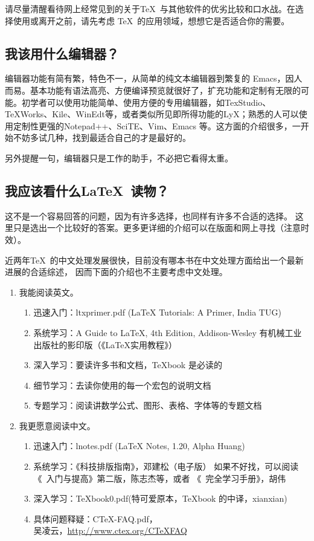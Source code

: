 请尽量清醒看待网上经常见到的关于\TeX~与其他软件的优劣比较和口水战。在选择使用或离开之前，请先考虑
\TeX~的应用领域，想想它是否适合你的需要。
\subsection{我该用什么编辑器？}
编辑器功能有简有繁，特色不一，从简单的纯文本编辑器到繁复的 Emacs，因人而易。基本功能有语法高亮、方便编译预览就很好了，扩充功能和定制有无限的可能。初学者可以使用功能简单、使用方便的专用编辑器，如TexStudio、TeXWorks、Kile、WinEdt等，或者类似所见即所得功能的LyX；熟悉的人可以使用定制性更强的Notepad++、SciTE、Vim、Emacs 等。这方面的介绍很多，一开始不妨多试几种，找到最适合自己的才是最好的。

另外提醒一句，编辑器只是工作的助手，不必把它看得太重。
\subsection{我应该看什么\LaTeX~读物？}
这不是一个容易回答的问题，因为有许多选择，也同样有许多不合适的选择。
这里只是选出一个比较好的答案。更多更详细的介绍可以在版面和网上寻找（注意时效）。

近两年\TeX~的中文处理发展很快，目前没有哪本书在中文处理方面给出一个最新进展的合适综述，
因而下面的介绍也不主要考虑中文处理。

\begin{enumerate}
	\item 我能阅读英文。
	      \begin{enumerate}
		      \item 迅速入门：ltxprimer.pdf (LaTeX Tutorials: A Primer, India TUG)
		      \item 系统学习：A Guide to LaTeX, 4th Edition, Addison-Wesley
		            有机械工业出版社的影印版（《\LaTeX{}实用教程》）
		      \item 深入学习：要读许多书和文档，TeXbook 是必读的
		      \item 细节学习：去读你使用的每一个宏包的说明文档
		      \item 专题学习：阅读讲数学公式、图形、表格、字体等的专题文档
	      \end{enumerate}
	\item 我更愿意阅读中文。
	      \begin{enumerate}
		      \item 迅速入门：lnotes.pdf (LaTeX Notes, 1.20, Alpha Huang)
		      \item 系统学习：《\LaTeXe{}科技排版指南》，邓建松（电子版）
		            如果不好找，可以阅读《\LaTeXe~入门与提高》第二版，陈志杰等，或者 《\LaTeXe~完全学习手册》，胡伟
		      \item 深入学习：TeXbook0.pdf(特可爱原本，TeXbook 的中译，xianxian)
		      \item 具体问题释疑：CTeX-FAQ.pdf，\\
		            吴凌云，\url{http://www.ctex.org/CTeXFAQ}
	      \end{enumerate}
\end{enumerate}

